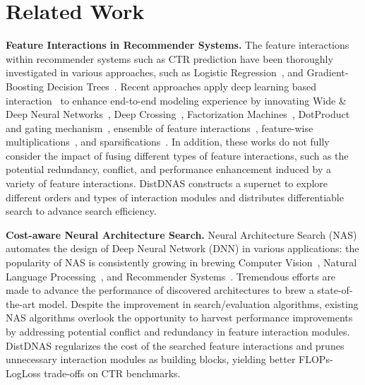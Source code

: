 \section{Related Work}

\noindent \textbf{Feature Interactions in Recommender Systems.}
The feature interactions within recommender systems such as CTR prediction have been thoroughly investigated in various approaches, such as Logistic Regression~\cite{richardson2007predicting}, and Gradient-Boosting Decision Trees~\cite{he2014practical}.
Recent approaches apply deep learning based interaction~\cite{zhang2019deep} to enhance end-to-end modeling experience by innovating Wide \& Deep Neural Networks~\cite{cheng2016wide}, Deep Crossing~\cite{wang2017deep}, Factorization Machines~\cite{guo2017deepfm,lian2018xdeepfm}, DotProduct~\cite{naumov2019deep} and gating mechanism~\cite{wang2017deep, wang2021dcn}, ensemble of feature interactions~\cite{zhang2022dhen}, feature-wise multiplications~\cite{wang2021masknet}, and sparsifications~\cite{deng2021deeplight}.
In addition, these works do not fully consider the impact of fusing different types of feature interactions, such as the potential redundancy, conflict, and performance enhancement induced by a variety of feature interactions.
DistDNAS constructs a supernet to explore different orders and types of interaction modules and distributes differentiable search to advance search efficiency.

\noindent \textbf{Cost-aware Neural Architecture Search.}     
Neural Architecture Search (NAS) automates the design of Deep Neural Network (DNN) in various applications: the popularity of NAS is consistently growing in brewing Computer Vision~\cite{zoph2018learning,liu2018darts,wen2020neural,cai2019once}, Natural Language Processing~\cite{so2019evolved,wang2020hat}, and Recommender Systems~\cite{song2020towards,gao2021progressive,krishna2021differentiable,zhang2022nasrec}.
Tremendous efforts are made to advance the performance of discovered architectures to brew a state-of-the-art model.
Despite the improvement in search/evaluation algorithms, existing NAS algorithms overlook the opportunity to harvest performance improvements by addressing potential conflict and redundancy in feature interaction modules.
DistDNAS regularizes the cost of the searched feature interactions and prunes unnecessary interaction modules as building blocks, yielding better FLOPs-LogLoss trade-offs on CTR benchmarks.